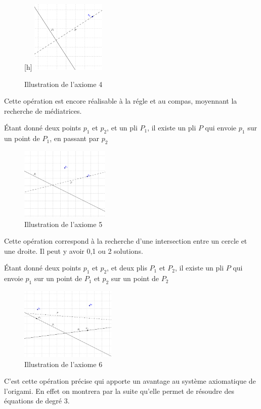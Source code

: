 \documentclass[a4paper,12pt,french]{report}
\begin{document}
		\begin{figure}
		    \begin{center}[h]
			\includegraphics[height=130px]{media/Ax4.eps}
		    \end{center}
			\caption{Illustration de l'axiome 4}
		\end{figure}
		Cette opération est encore réalisable à la régle et au compas, moyennant la recherche de médiatrices.
		\begin{axiome}
			Étant donné deux points $p_{1}$ et $p_{2}$, et un pli $P_{1}$, il existe un pli $P$ qui envoie $p_{1}$ sur un point de $P_{1}$, en passant par $p_{2}$
		\end{axiome}
		\begin{figure}[h]
		    \begin{center}
			\includegraphics[height=130px]{media/Ax5.eps}
		    \end{center}
			\caption{Illustration de l'axiome 5}
		\end{figure}
		Cette opération correspond à la recherche d'une intersection entre un cercle et une droite. Il peut y avoir 0,1 ou 2 solutions.
		
		
		\begin{axiome}
			Étant donné deux points $p_{1}$ et $p_{2}$, et deux plis $P_{1}$ et $P_{2}$, il existe un pli $P$ qui envoie $p_{1}$ sur un point de $P_{1}$ et $p_{2}$ sur un point de $P_{2}$
		\end{axiome}
		\begin{figure}[h]
		    \begin{center}
			\includegraphics[height=130px]{media/Ax6.eps}
		    \end{center}
			\caption{Illustration de l'axiome 6}
		\end{figure}
		 C'est cette opération précise qui apporte un avantage au système axiomatique de l'origami. En effet on montrera par la suite qu'elle permet de résoudre des équations de degré 3.
		
\end{document}
